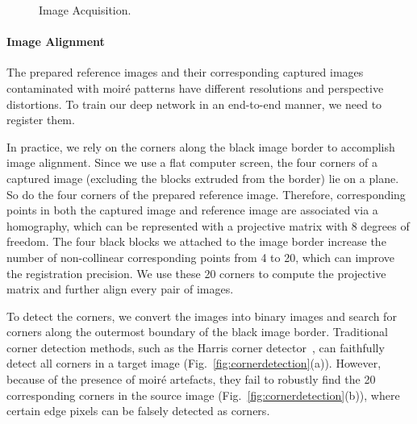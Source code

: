 \documentclass[journal]{IEEEtran}
\begin{document}
\begin{figure}[t]
\begin{center}
\end{center}
\begin{center}
\hspace{-0.5em}
\hspace{-0.5em}
\end{center}
\caption{Image Acquisition. }
\label{fig:datacollection}
\end{figure}



\paragraph{Image Alignment}
The prepared reference images and their corresponding captured images contaminated with moir\'{e} patterns have different resolutions and perspective distortions. To train our deep network in an end-to-end manner, we need to register them. 

In practice, we rely on the corners along the black image border to accomplish image alignment. Since we use a flat computer screen, the four corners of a captured image (excluding the blocks extruded from the border) lie on a plane. So do the four corners of the prepared reference image. Therefore, corresponding points in both the captured image and reference image are associated via a homography, which can be represented with a  projective matrix with 8 degrees of freedom. The four black blocks we attached to the image border increase the number of non-collinear corresponding points from 4 to 20, which can improve the registration precision. We use these 20 corners to compute the projective matrix and further align every pair of images.

To detect the corners, we convert the images into binary images and search for corners along the outermost boundary of the black image border. Traditional corner detection methods, such as the Harris corner detector~\cite{harris1988combined}, can faithfully detect all corners in a target image (Fig.~\ref{fig:cornerdetection}(a)). However, because of the presence of moir\'{e} artefacts, they fail to robustly find the 20 corresponding corners in the source image (Fig.~\ref{fig:cornerdetection}(b)), where certain edge pixels can be falsely detected as corners. 
\end{document}
